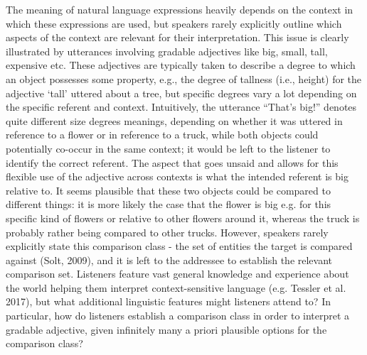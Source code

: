 The meaning of natural language expressions heavily depends on the context in which these expressions are used, but speakers rarely explicitly outline which aspects of the context are relevant for their interpretation. 
	This issue is clearly illustrated by utterances involving gradable adjectives like big, small, tall, expensive etc. These adjectives are typically taken to describe a degree to which an object possesses some property, e.g., the degree of tallness (i.e., height) for the adjective ‘tall’ uttered about a tree, but specific degrees vary a lot depending on the specific referent and context. Intuitively, the utterance “That’s big!” denotes quite different size degrees meanings, depending on whether it was uttered in reference to a flower or in reference to a truck, while both objects could potentially co-occur in the same context; it would be left to the listener to identify the correct referent. The aspect that goes unsaid and allows for this flexible use of the adjective across contexts is what the intended referent is big relative to. It seems plausible that these two objects could be compared to different things: it is more likely the case that the flower is big e.g. for this specific kind of flowers or relative to other flowers around it, whereas the truck is probably rather being compared to other trucks. 
	However, speakers rarely explicitly state this comparison class - the set of entities the target is compared against (Solt, 2009), and it is left to the addressee to establish the relevant comparison set. Listeners feature vast general knowledge and experience about the world helping them interpret context-sensitive language (e.g. Tessler et al. 2017), but what additional linguistic features might listeners attend to? In particular, how do listeners establish a comparison class in order to interpret a gradable adjective, given infinitely many a priori plausible options for the comparison class? 
	
